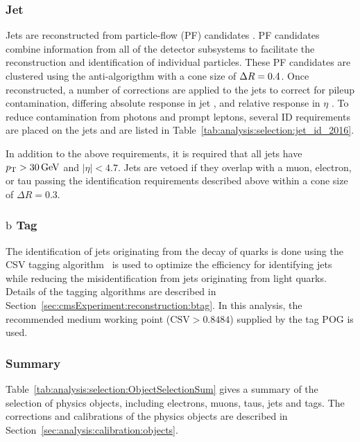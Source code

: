 \subsubsection{Jet}
Jets are reconstructed from particle-flow (PF) candidates \cite{ref:pf}. PF candidates combine information from all of the detector subsystems to facilitate the reconstruction and identification of individual particles.  These PF candidates are clustered using the anti-\kt algorigthm \cite{Cacciari:2008gp} with a cone size of $\Delta R = 0.4$. Once reconstructed, a number of corrections are applied to the jets to correct for pileup contamination, differing absolute response in jet \pt, and relative response in $\eta$ \cite{ref:jetscale}.  To reduce contamination from photons and prompt leptons, several ID requirements are placed on the jets and are listed in Table~\ref{tab:analysis:selection:jet_id_2016}.



\noindent In addition to the above requirements, it is required that all jets have $p_{\mathrm{T}} > 30\,\text{Ge\hspace{-.08em}V}$ and $|\eta| < 4.7$.  Jets are vetoed if they overlap with a muon, electron, or tau passing the identification requirements described above within a cone size of $\Delta R = 0.3$. 

\subsubsection{$\mathrm{b}$ Tag} The identification of jets originating from the decay of \PQb quarks is done using the CSV \PQb tagging algorithm~\cite{Sirunyan:2298594} is used to optimize the efficiency for identifying \PQb jets while reducing the misidentification from jets originating from light quarks. Details of the \PQb tagging algorithms are described in Section~\ref{sec:cmsExperiment:reconstruction:btag}.  In this analysis, the recommended medium working point ($\text{CSV} > 0.8484$) supplied by the \PQb tag POG is used. 




\subsubsection{Summary}

Table~\ref{tab:analysis:selection:ObjectSelectionSum} gives a summary of the selection of physics objects, including electrons, muons, taus, jets and \PQb tags. The corrections and calibrations of the physics objects are described in Section~\ref{sec:analysis:calibration:objects}.




